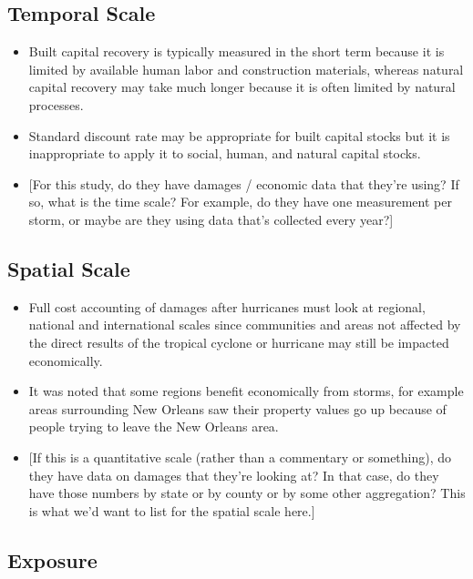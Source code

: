 \documentclass[
]{article}
\providecommand{\tightlist}{%
  \setlength{\itemsep}{0pt}\setlength{\parskip}{0pt}}
\begin{document}
\hypertarget{temporal-scale-20}{%
\subsection{Temporal Scale}\label{temporal-scale-20}}

\begin{itemize}
\tightlist
\item
  Built capital recovery is typically measured in the short term because
  it is limited by available human labor and construction materials,
  whereas natural capital recovery may take much longer because it is
  often limited by natural processes.
\item
  Standard discount rate may be appropriate for built capital stocks but
  it is inappropriate to apply it to social, human, and natural capital
  stocks.
\item
  {[}For this study, do they have damages / economic data that they're
  using? If so, what is the time scale? For example, do they have one
  measurement per storm, or maybe are they using data that's collected
  every year?{]}
\end{itemize}

\hypertarget{spatial-scale-20}{%
\subsection{Spatial Scale}\label{spatial-scale-20}}

\begin{itemize}
\tightlist
\item
  Full cost accounting of damages after hurricanes must look at
  regional, national and international scales since communities and
  areas not affected by the direct results of the tropical cyclone or
  hurricane may still be impacted economically.
\item
  It was noted that some regions benefit economically from storms, for
  example areas surrounding New Orleans saw their property values go up
  because of people trying to leave the New Orleans area.
\item
  {[}If this is a quantitative scale (rather than a commentary or
  something), do they have data on damages that they're looking at? In
  that case, do they have those numbers by state or by county or by some
  other aggregation? This is what we'd want to list for the spatial
  scale here.{]}
\end{itemize}

\hypertarget{exposure-19}{%
\subsection{Exposure}\label{exposure-19}}
\end{document}
